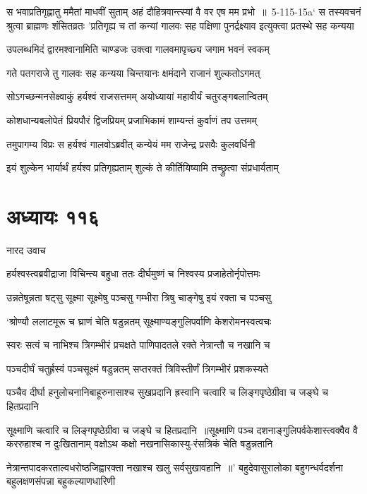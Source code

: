 \fourlineindentedshloka
{स भवाप्रतिगृह्णातु ममैतां माधवीं सुताम्}
{अहं दौहित्रवान्त्स्यां वै वर एष मम प्रभो ॥ 5-115-15a` स तस्यवचनं श्रुत्वा ब्राह्मणः शंसितव्रतः}
{'प्रतिगृह्य च तां कन्यां गालवः सह पक्षिणा}
{पुनर्द्रक्ष्याव इत्युक्त्वा प्रतस्थे सह कन्यया}


\twolineshloka
{उपलब्धमिदं द्वारमश्वानामिति चाण्डजः}
{उक्त्वा गालवमापृच्छ्य जगाम भवनं स्वकम्}


\twolineshloka
{गते पतगराजे तु गालवः सह कन्यया}
{चिन्तयानः क्षमंदाने राजानं शुल्कतोऽगमत्}


\twolineshloka
{सोऽगच्छन्मनसेक्ष्वाकुं हर्यश्वं राजसत्तमम्}
{अयोध्यायां महावीर्यं चतुरङ्गबलान्वितम्}


\twolineshloka
{कोशधान्यबलोपेतं प्रियपौरं द्विजप्रियम्}
{प्रजाभिकामं शाम्यन्तं कुर्वाणं तप उत्तमम्}


\twolineshloka
{तमुपागम्य विप्रः स हर्यश्वं गालवोऽब्रवीत्}
{कन्येयं मम राजेन्द्र प्रसवैः कुलवर्धिनी}


\twolineshloka
{इयं शुल्केन भार्यार्थं हर्यश्व प्रतिगृह्यताम्}
{शुल्कं ते कीर्तियिष्यामि तच्छ्रुत्वा संप्रधार्यताम्}


\chapter{अध्यायः ११६}
\twolineshloka
{नारद उवाच}
{}


\twolineshloka
{हर्यश्वस्त्वब्रवीद्राजा विचिन्त्य बहुधा ततः}
{दीर्घमुष्णं च निश्वस्य प्रजाहेतोर्नृपोत्तमः}


\twolineshloka
{उन्नतेषून्नता षट्सु सूक्ष्मा सूक्ष्मेषु पञ्चसु}
{गम्भीरा त्रिषु चाङ्गेषु इयं रक्ता च पञ्चसु}


\threelineshloka
{`श्रोण्यौ ललाटमूरू च घ्राणं चेति षडुन्नतम्}
{सूक्ष्माण्यङ्गुलिपर्वाणि केशरोमनस्वत्वचः}
{}


\twolineshloka
{स्वरः सत्वं च नाभिश्च त्रिगम्भीरं प्रचक्षते}
{पाणिपादतले रक्ते नेत्रान्तौ च नखानि च}


\twolineshloka
{पञ्चदीर्घं चतुर्ह्रस्वं पञ्चसूक्ष्मं षडुन्नतम्}
{सप्तरक्तं त्रिविस्तीर्णं त्रिगम्भीरं प्रशकस्यते}


\twolineshloka
{पञ्चैव दीर्घा हनुलोचनानिबाहूरुनासाश्च सुखप्रदानि}
{ह्रस्वानि चत्वारि च लिङ्गपृष्ठेग्रीवा च जङ्घे च हितप्रदानि}


\twolineshloka
{सूक्ष्माणि चत्वारि च लिङ्गपृष्ठेग्रीवा च जङ्घे च हितप्रदानि ॥सूक्ष्माणि पञ्च दशनाङ्गुलिपर्वकेशास्त्वक्वैव वै कररुहाश्च न दुःखितानाम्}
{वक्षोऽथ कक्षो नखनासिकास्यु-रंसत्रिकं चेति षडुन्नतानि}


नेत्रान्तपादकरताल्वधरोष्ठजिह्वारक्ता नखाश्च खलु सर्वसुखावहानि ॥'
\twolineshloka
{बहुदेवासुरालोका बहुगन्धर्वदर्शना}
{बहुलक्षणसंपन्ना बहुकल्याणधारिणी}



